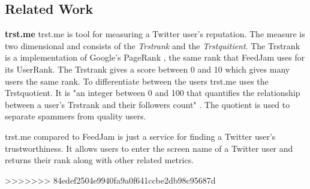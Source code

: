 \subsection{Related Work}
{\bf trst.me} \newline
trst.me \citet{Infochimps2012b} is tool for measuring a Twitter user's reputation. The measure is two dimensional and consists of the \emph{ Trstrank} and the \emph{Trstquitient}. The Trstrank is a implementation of Google's PageRank \citep{Infochimps2012a}, the same rank that FeedJam uses for its UserRank. The Trstrank gives a score between 0 and 10 which gives many users the same rank. To differentiate between the users trst.me uses the Trstquotient. It is "an integer between 0 and 100 that quantifies the relationship between a user's Trstrank and their followers count" \citep{Infochimps2012}. The quotient is used to separate spammers from quality users. 

trst.me compared to FeedJam is just a service for finding a Twitter user's trustworthiness. It allows users to enter the screen name of a Twitter user and returns their rank along with other related metrics.

>>>>>>> 84edef2504e9940fa9a0f641ccbe2db98c95687d
